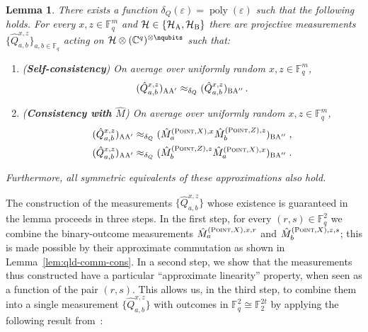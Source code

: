 \documentclass[11pt]{article}
\newtheorem{lemma}[theorem]{Lemma}
\theoremstyle{definition}
\newcommand{\C}{\ensuremath{\mathbb{C}}}
\newcommand{\F}{\ensuremath{\mathbb{F}}}
\newcommand{\mH}{\ensuremath{\mathcal{H}}}
\DeclareMathOperator{\poly}{poly}
\newcommand{\eps}{\varepsilon}
\newcommand{\labelstyle}[1]{\ensuremath{\textsc{#1}}\xspace}
\newcommand{\alice}{\labelstyle{A}}
\newcommand{\bob}{\labelstyle{B}}
\newcommand{\typestyle}[1]{\ensuremath{\textsc{#1}}\xspace}
\newcommand{\Point}{\typestyle{Point}}
\begin{document}
\begin{lemma}\label{lem:qld-4-10}
There exists a function $\delta_Q(\eps) = \poly(\eps)$ such that the following holds. 
	For every $x,z \in \F_q^m$ and $\mH \in \{ \mH_\alice, \mH_\bob\}$ there are projective measurements $\{ \hat{Q}^{x,z}_{a,b} \}_{a,b \in \F_q}$ acting on $\mathcal{H} \otimes (\C^q)^{\otimes \nqubits}$ such that:
	\begin{enumerate}
		\item (\textbf{Self-consistency}) On average over uniformly random $x,z \in \F_q^m$,
		\begin{equation}
			\label{eq:qld-q-self-cons}
			(\hat{Q}^{x,z}_{a,b})_{\alice \alice'}  \approx_{\delta_Q} (\hat{Q}^{x,z}_{a,b})_{\bob \alice''}\,.
		\end{equation}
		
		\item (\textbf{Consistency with $\hat{M}$}) On average over uniformly random $x,z \in \F_q^m$,
		\begin{gather}
			\label{eq:qld-q-cons-m-hat-xz}
				(\hat{Q}^{x,z}_{a,b})_{\alice \alice'} \approx_{\delta_Q} (\hat{M}^{(\Point,X),x}_{a} \hat{M}^{(\Point,Z),z}_b)_{\bob \alice''}\;, \\
							\label{eq:qld-q-cons-m-hat-zx}
				(\hat{Q}^{x,z}_{a,b})_{\alice \alice'} \approx_{\delta_Q} (\hat{M}^{(\Point,Z),z}_b  \hat{M}^{(\Point,X),x}_{a} )_{\bob \alice''}\;.
		\end{gather}
              \end{enumerate}
                    Furthermore, all symmetric equivalents of these approximations
      also hold.
\end{lemma}

The construction of the measurements $\{ \hat{Q}^{x,z}_{a,b} \}$ whose existence is guaranteed in the lemma proceeds in three steps. In the first step, for every $(r,s)\in\F_q^2$ we combine the binary-outcome measurements $\hat{M}^{(\Point,X),x,r}_a$ and $\hat{M}^{(\Point,X),z,s}_b$; this is made possible by their approximate commutation as shown in Lemma~\ref{lem:qld-comm-cons}. In a second step, we show that the measurements thus constructed have a particular ``approximate linearity'' property, when seen as a function of the pair $(r,s)$. This allows us, in the third step, to combine them into a single measurement $\{ \hat{Q}^{x,z}_{a,b} \}$ with outcomes in $\F_q^2\cong \F_2^{2t}$ by applying the following  result from~\cite{NV17}:
	
\end{document}
